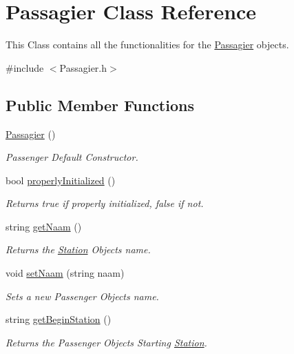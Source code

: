 \hypertarget{classPassagier}{}\section{Passagier Class Reference}
\label{classPassagier}


This Class contains all the functionalities for the \hyperlink{classPassagier}{Passagier} objects.  




{\ttfamily \#include $<$Passagier.\+h$>$}

\subsection*{Public Member Functions}
\begin{DoxyCompactItemize}
\item 
\hyperlink{classPassagier_a1a2bc82f5780448cd2a9a47d08cc824f}{Passagier} ()
\begin{DoxyCompactList}\small\item\em Passenger Default Constructor. \end{DoxyCompactList}\item 
bool \hyperlink{classPassagier_ae271ce7875b2a7d17704e204ce9d8568}{properly\+Initialized} ()
\begin{DoxyCompactList}\small\item\em Returns true if properly initialized, false if not. \end{DoxyCompactList}\item 
string \hyperlink{classPassagier_aa9a9b53d417979551b0cb30fb0fdd232}{get\+Naam} ()
\begin{DoxyCompactList}\small\item\em Returns the \hyperlink{classStation}{Station} Object\textquotesingle{}s name. \end{DoxyCompactList}\item 
void \hyperlink{classPassagier_a8d7a04358b35de18f378d048610e9aff}{set\+Naam} (string naam)
\begin{DoxyCompactList}\small\item\em Sets a new Passenger Object\textquotesingle{}s name. \end{DoxyCompactList}\item 
string \hyperlink{classPassagier_a41e0870bb942364181aa17e2c9c7ca6c}{get\+Begin\+Station} ()
\begin{DoxyCompactList}\small\item\em Returns the Passenger Object\textquotesingle{}s Starting \hyperlink{classStation}{Station}. \end{DoxyCompactList}\item 

\end{DoxyCompactItemize}
